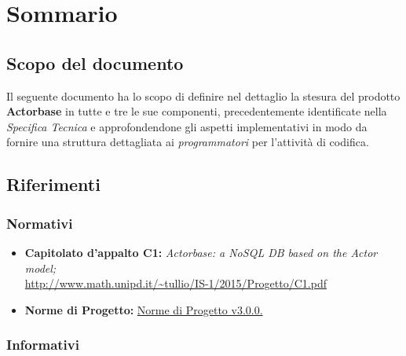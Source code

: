 \documentclass{scalatekids-article}
\begin{document}
\section{Sommario}

\subsection{Scopo del documento}

Il seguente documento ha lo scopo di definire nel dettaglio la stesura del
prodotto \textbf{Actorbase} in tutte e tre le sue componenti, precedentemente
identificate nella \textit{Specifica Tecnica} e approfondendone gli aspetti
implementativi in modo da fornire una struttura dettagliata ai
\textit{programmatori} per l'attività di codifica.

\prodPurpose

\glossExpl

\subsection{Riferimenti}

\subsubsection{Normativi}

\begin{itemize}

\item\textbf{Capitolato d'appalto C1:} \textit{Actorbase: a NoSQL DB based on the Actor model;}\\
  \url{http://www.math.unipd.it/~tullio/IS-1/2015/Progetto/C1.pdf}
\item\textbf{Norme di Progetto:}
  \href{run:../Interni/NormeDiProgetto\_v3.0.0.pdf}{Norme di Progetto v3.0.0.}
\end{itemize}

\subsubsection{Informativi}
\end{document}
